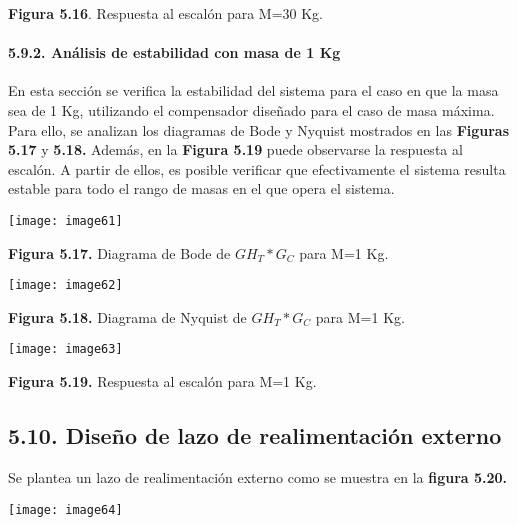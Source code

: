 \documentclass{article} %
\begin{document}
\noindent \textbf{Figura 5.16}. Respuesta al escal\'{o}n para M=30 Kg.

\noindent 

\noindent 

\noindent 
\paragraph{5.9.2. An\'{a}lisis de estabilidad con masa de 1 Kg}

\noindent 

\noindent En esta secci\'{o}n se verifica la estabilidad del sistema  para el caso en que la masa sea de 1 Kg, utilizando el compensador dise\~{n}ado para el caso de masa m\'{a}xima. Para ello, se analizan los diagramas de Bode y Nyquist mostrados en las \textbf{Figuras 5.17 }y \textbf{5.18.} Adem\'{a}s, en la \textbf{Figura 5.19 }puede observarse la respuesta al escal\'{o}n. A partir de ellos, es posible verificar que efectivamente el sistema resulta estable para todo el rango de masas en el que opera el sistema. 

\noindent \texttt{[image: image61]}

\noindent \textbf{Figura 5.17. }Diagrama de Bode de ${GH}_T*G_C$ para M=1 Kg.\textbf{}

\noindent \textbf{}

\noindent \texttt{[image: image62]}

\noindent  \textbf{Figura 5.18. }Diagrama de Nyquist de ${GH}_T*G_C$ para M=1 Kg.\textbf{}

 

\noindent 

\noindent 

\noindent \texttt{[image: image63]}

\noindent \textbf{Figura 5.19.} Respuesta al escal\'{o}n para M=1 Kg.

\noindent 
\subsection{5.10.  Dise\~{n}o de lazo de realimentaci\'{o}n externo}

\noindent 

\noindent Se plantea un lazo de realimentaci\'{o}n externo como se muestra en la  \textbf{figura 5.20.}

\noindent \texttt{[image: image64]}

\noindent 
\end{document}
